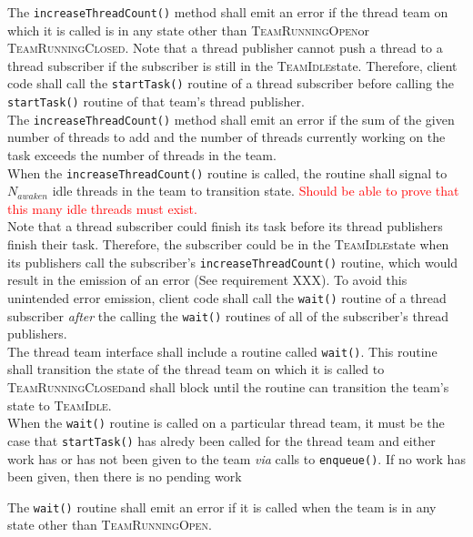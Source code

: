 \documentclass{article}
\newcommand{\TeamIdle}          {\textsc{TeamIdle}}
\newcommand{\TeamRunningOpen}   {\textsc{TeamRunningOpen}}
\newcommand{\TeamRunningClosed} {\textsc{TeamRunningClosed}}
\begin{document}
The \texttt{increaseThreadCount()} method shall emit an error if the thread team
on which it is called is in any state other than \TeamRunningOpen or
\TeamRunningClosed.  Note that a thread publisher cannot push a thread to a
thread subscriber if the subscriber is still in the \TeamIdle state.  Therefore,
client code shall call the \texttt{startTask()} routine of a thread subscriber
before calling the \texttt{startTask()} routine of that team's thread publisher.\\

The \texttt{increaseThreadCount()} method shall emit an error if the sum of the
given number of threads to add and the number of threads currently working on
the task exceeds the number of threads in the team.\\

When the \texttt{increaseThreadCount()} routine is called, the routine shall
signal to $N_{awaken}$ idle threads in the team to transition state.
\textcolor{red}{Should be able to prove that this many idle threads must
exist.}\\

Note that a thread subscriber could finish its task before its thread
publishers finish their task.  Therefore, the subscriber could be in the
\TeamIdle state when its publishers call the subscriber's
\texttt{increaseThreadCount()} routine, which would result in the emission of an
error (See requirement XXX).  To avoid this unintended error emission, client code shall call the
\texttt{wait()} routine of a thread subscriber \emph{after} the calling the
\texttt{wait()} routines of all of the subscriber's thread publishers.\\

The thread team interface shall include a routine called \texttt{wait()}.  This
routine shall transition the state of the thread team on which it is called to
\TeamRunningClosed and shall block until the routine can transition the team's
state to \TeamIdle.\\

When the \texttt{wait()} routine is called on a particular thread team, it must
be the case that \texttt{startTask()} has alredy been called for the thread team
and either work has or has not been given to the team \textit{via} calls to
\texttt{enqueue()}.  If no work has been given, then there is no pending work

The \texttt{wait()} routine shall emit an error if it is called when the team is
in any state other than \TeamRunningOpen.\\
\end{document}
